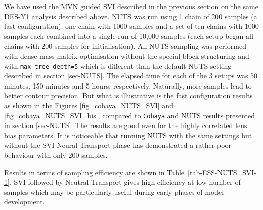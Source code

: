 \documentclass[twocolumn,twocolappendix,nofootinbib,iop]{openjournal}
\newcommand{\JZ}[1]{{\color{purple}JZ: #1}}
\newcommand{\numpyro}{\texttt{NumPyro}}
\begin{document}
%
We have used the MVN guided SVI described in the previous section on the same DES-Y1 analysis described above. NUTS was run using 1 chain of 200 samples (a fast configuration), one chain with 1000 samples and a set of ten chains with 1000 samples each combined into a single run of 10,000 samples (each setup began all chains with 200 samples for initialisation). All NUTS sampling was performed with dense mass matrix optimisation without the special block structuring and with \texttt{max\_tree\_depth=5} which is different than the default NUTS setting described in section \ref{sec-NUTS}. The elapsed time for each of the 3 setups was 50 minutes, 150 minutes and 5 hours, respectively. Naturally, more samples lead to better contour precision. But what is illustrative is the fast configuration results as shown in the Figures \ref{fig_cobaya_NUTS_SVI} and \ref{fig_cobaya_NUTS_SVI_bis}, compared to \texttt{Cobaya} and NUTS results presented in section \ref{sec-NUTS}. The results are good even for the highly correlated lens bias parameters. It is noticeable that running NUTS with the same settings  but without the SVI Neural Transport phase has demonstrated a rather poor behaviour with only 200 samples.

Results in terms of sampling efficiency are shown in Table~\ref{tab-ESS-NUTS_SVI-1}. SVI followed by Neutral Transport gives high efficiency at low number of samples which may be particularly useful during early phases of model development.
%
\end{document}
